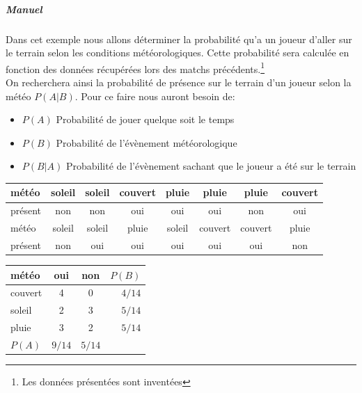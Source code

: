 \documentclass[a4paper,12pt]{article}
\begin{document}
				\subparagraph{Manuel}
					Dans cet exemple nous allons déterminer la probabilité qu'a un joueur d'aller sur le terrain selon les conditions météorologiques. Cette probabilité sera calculée en fonction des données récupérées lors des matchs précédents.\footnote{Les données présentées sont inventées} \\
					
					On recherchera ainsi la probabilité de présence sur le terrain d'un joueur selon la météo $P(A|B)$. Pour ce faire nous auront besoin de: 
					\begin{itemize}
						\item $P(A)$ Probabilité de jouer quelque soit le temps
						\item $P(B)$ Probabilité de l'évènement météorologique
						\item $P(B|A)$ Probabilité de l'évènement sachant que le joueur a été sur le terrain					
					\end{itemize}
				
				\begin{table}[H]
					\centering
					 \label{tab:data}
					\begin{tabular}{|l|c|c|c|c|c|c|c|}
						\hline
						météo & soleil & soleil & couvert & pluie & pluie & pluie & couvert \\
						\hline
						présent & non & non & oui & oui & oui & non & oui \\
						\hline
						\hline
						météo & soleil & soleil & pluie & soleil & couvert & couvert & pluie \\
						\hline
						présent & non & oui & oui & oui & oui & oui & non \\
						\hline
					\end{tabular}
				\end{table}
				
				\begin{table}[H]
					\centering
					 \label{tab:pab}
					\begin{tabular}{|l|c|c|r|}
						\hline
						météo & oui & non & $P(B)$\\
						\hline
						couvert & 4 & 0 & $4/14$\\
						\hline
						soleil & 2 & 3 & $5/14$\\
						\hline
						pluie & 3 & 2 & $5/14$\\
						\hline
						$P(A)$ & $9/14$ & $5/14$ & \\
						\hline
					\end{tabular}
				\end{table}
						
\end{document}
